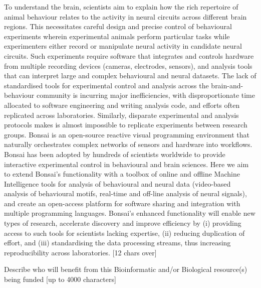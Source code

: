 To understand the brain, scientists aim to explain how the rich repertoire of animal behaviour relates to the activity in neural circuits across different brain regions. This necessitates careful design and precise control of behavioural experiments wherein experimental animals perform particular tasks while experimenters either record or manipulate neural activity in candidate neural circuits. Such experiments require software that integrates and controls hardware from multiple recording devices (cameras, electrodes, sensors), and analysis tools that can interpret large and complex behavioural and neural datasets. The lack of standardised tools for experimental control and analysis across the brain-and-behaviour community is incurring major inefficiencies, with disproportionate time allocated to software engineering and writing analysis code, and efforts often replicated across laboratories. Similarly, disparate experimental and analysis protocols makes is almost impossible to replicate experiments between research groups.
Bonsai is an open-source reactive visual programming environment that naturally orchestrates complex networks of sensors and hardware into workflows. Bonsai has been adopted by hundreds of scientists worldwide to provide interactive experimental control in behavioural and brain sciences. Here we aim to extend Bonsai’s functionality with a toolbox of online and offline Machine Intelligence tools for analysis of behavioural and neural data (video-based analysis of behavioural motifs, real-time and off-line analysis of neural signals), and create an open-access platform for software sharing and integration with multiple programming languages. Bonsai’s enhanced functionality will enable new types of research, accelerate discovery and improve efficiency by (i) providing access to such tools for scientists lacking expertise, (ii) reducing duplication of effort, and (iii) standardising the data processing streams, thus increasing reproducibility across laboratories.
[12 chars over]


Describe who will benefit from this Bioinformatic and/or Biological resource(s) being funded [up to 4000 characters]



